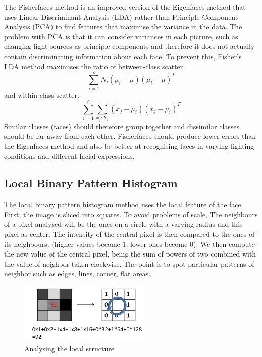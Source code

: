 The Fisherfaces method is an improved version of the Eigenfaces method that uses Linear Discriminant Analysis (LDA) rather than Principle Component Analysis (PCA) to find features that maximise the variance in the data. The problem with PCA is that it can consider variances in each picture, such as changing light sources as principle components and therefore it does not actually contain discriminating information about each face. To prevent this, Fisher's LDA method maximises the ratio of between-class scatter 
\begin{equation}
	\sum\limits_{i=1}^{c}N_{i}(\mu_{i}-\mu)(\mu_{i}-\mu)^T
\end{equation}
and within-class scatter.
\begin{equation}
	\sum\limits_{i=1}^{c}\sum\limits_{x_{j}\epsilon X_{i}}^{}(x_{j}-\mu_{i})(x_{j}-\mu_{i})^T
\end{equation}
Similar classes (faces) should therefore group together and dissimilar classes should be far away from each other.
Fisherfaces should produce lower errors than the Eigenfaces method and also be better at recognising faces in varying lighting conditions and different facial expressions.\cite{Eigenfaces_vs_fisherfaces}

\subsection{Local Binary Pattern Histogram}

The local binary pattern histogram method uses the local feature of the face. First, the image is sliced into squares.
To avoid problems of scale, The neighbours of a pixel analysed will be the ones on a circle with a varying radius and this pixel as center.
The intensity of the central pixel is then compared to the ones of its neighbours. (higher values become 1, lower ones become 0).
We then compute the new value of the central pixel, being the sum of powers of two combined with the value of neighbor taken clockwise. The point is to spot particular patterns of neighbor such as edges, lines, corner, flat areas.

\begin{figure}[ht]
\centering
\includegraphics[width=2.5in]{rsrc/LBPH1.jpg}
\caption{Analysing the local structure}
\label{Local Structure}
\end{figure}

